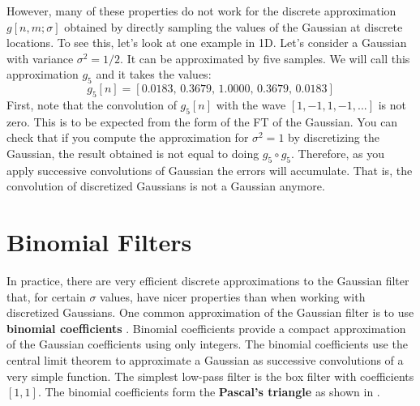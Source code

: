 However, many of these properties do not work for the discrete approximation $g\left[n,m;\sigma \right]$ obtained by directly sampling the values of the Gaussian at discrete locations. To see this, let's look at one example in 1D. Let's consider a Gaussian with variance $\sigma^2=1/2$. It can be approximated by five samples. We will call this approximation $g_5$ and it takes the values:
\begin{equation}
	g_5\left[ n \right] = \left[0.0183, \,    0.3679, \,    1.0000, \,    0.3679, \,    0.0183 \right]
\end{equation}
First, note that the convolution of $g_5\left[ n \right]$ with the wave $\left[1,-1,1,-1,...\right]$ is not zero. This is to be expected from the form of the FT of the Gaussian. You can check that if you compute the approximation for $\sigma^2=1$ by discretizing the Gaussian, the result obtained is not equal to doing $g_5 \circ g_5$. Therefore, as you apply successive convolutions of Gaussian the errors will accumulate. That is, the convolution of discretized Gaussians is not a Gaussian anymore.

\section{Binomial Filters}

In practice, there are very efficient discrete approximations to the Gaussian filter that, for certain $\sigma$ values, have nicer properties than when working with discretized Gaussians. One common approximation of the Gaussian filter is to use {\bf binomial coefficients} \cite{Chehikian91}. Binomial coefficients provide a compact approximation of the Gaussian coefficients using only integers. The binomial coefficients use the central limit theorem to approximate a Gaussian as successive convolutions of a very simple function. The simplest low-pass filter is the box filter with coefficients $\left[1,1\right]$. The binomial coefficients form the {\bf Pascal's triangle} as shown in \fig{\ref{fig:pascaltriangle}}.

